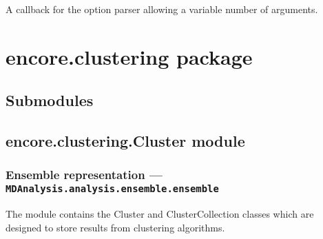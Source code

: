 \documentclass[letterpaper,10pt,english]{sphinxmanual}
\begin{document}

\begin{fulllineitems}
\label{index:encore.utils.vararg_callback}
A callback for the option parser allowing a variable number of arguments.

\end{fulllineitems}



\chapter{encore.clustering package}
\label{index:encore-clustering-package}

\section{Submodules}
\label{index:id7}

\section{encore.clustering.Cluster module}
\label{index:module-encore.clustering.Cluster}\label{index:encore-clustering-cluster-module}

\subsection{Ensemble representation --- \texttt{MDAnalysis.analysis.ensemble.ensemble}}
\label{index:id8}
The module contains the Cluster and ClusterCollection classes which are designed
to store results from clustering algorithms.
\end{document}
